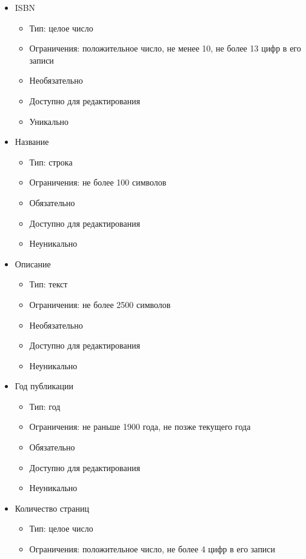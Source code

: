 \documentclass[data-specification.tex]{subfiles}
\begin{document}
\begin{itemize}
    \item ISBN
    \begin{itemize}
        \item Тип: целое число
        \item Ограничения: положительное число, не менее 10, не более 13 цифр в его записи
        \item Необязательно
        \item Доступно для редактирования
        \item Уникально
    \end{itemize}
    \item Название
    \begin{itemize}
        \item Тип: строка
        \item Ограничения: не более 100 символов
        \item Обязательно
        \item Доступно для редактирования
        \item Неуникально
    \end{itemize}
    \item Описание
    \begin{itemize}
        \item Тип: текст
        \item Ограничения: не более 2500 символов
        \item Необязательно
        \item Доступно для редактирования
        \item Неуникально
    \end{itemize}
    \item Год публикации
    \begin{itemize}
        \item Тип: год
        \item Ограничения: не раньше 1900 года, не позже текущего года
        \item Обязательно
        \item Доступно для редактирования
        \item Неуникально
    \end{itemize}
    \item Количество страниц
    \begin{itemize}
        \item Тип: целое число
        \item Ограничения: положительное число, не более 4 цифр в его записи

\end{itemize}
\end{itemize}
\end{document}
